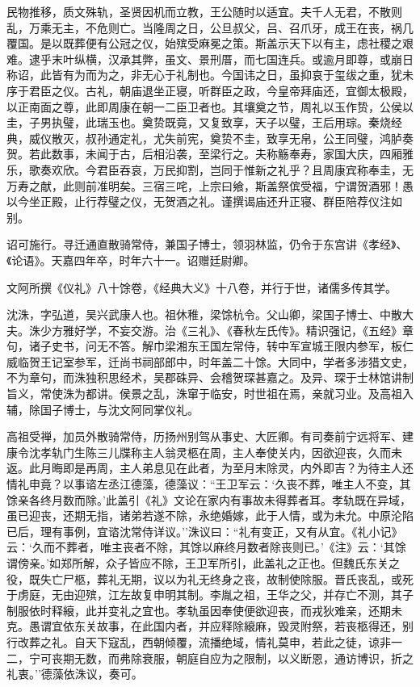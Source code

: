 \documentclass[]{article}
\begin{document}
民物推移，质文殊轨，圣贤因机而立教，王公随时以适宜。夫千人无君，不散则乱，万乘无主，不危则亡。当隆周之日，公旦叔父，吕、召爪牙，成王在丧，祸几覆国。是以既葬便有公冠之仪，始殡受麻冕之策。斯盖示天下以有主，虑社稷之艰难。逮乎末叶纵横，汉承其弊，虽文、景刑厝，而七国连兵。或逾月即尊，或崩日称诏，此皆有为而为之，非无心于礼制也。今国讳之日，虽抑哀于玺绂之重，犹未序于君臣之仪。古礼，朝庙退坐正寝，听群臣之政，今皇帝拜庙还，宜御太极殿，以正南面之尊，此即周康在朝一二臣卫者也。其壤奠之节，周礼以玉作贽，公侯以圭，子男执璧，此瑞玉也。奠贽既竟，又复致享，天子以璧，王后用琮。秦烧经典，威仪散灭，叔孙通定礼，尤失前宪，奠贽不圭，致享无帛，公王同璧，鸿胪奏贺。若此数事，未闻于古，后相沿袭，至梁行之。夫称觞奉寿，家国大庆，四厢雅乐，歌奏欢欣。今君臣吞哀，万民抑割，岂同于惟新之礼乎？且周康宾称奉圭，无万寿之献，此则前准明矣。三宿三咤，上宗曰飨，斯盖祭傧受福，宁谓贺酒邪！愚以今坐正殿，止行荐璧之仪，无贺酒之礼。谨撰谒庙还升正寝、群臣陪荐仪注如别。

诏可施行。寻迁通直散骑常侍，兼国子博士，领羽林监，仍令于东宫讲《孝经》、《论语》。天嘉四年卒，时年六十一。诏赠廷尉卿。

文阿所撰《仪礼》八十馀卷，《经典大义》十八卷，并行于世，诸儒多传其学。

沈洙，字弘道，吴兴武康人也。祖休稚，梁馀杭令。父山卿，梁国子博士、中散大夫。洙少方雅好学，不妄交游。治《三礼》、《春秋左氏传》。精识强记，《五经》章句，诸子史书，问无不答。解巾梁湘东王国左常侍，转中军宣城王限内参军，板仁威临贺王记室参军，迁尚书祠部郎中，时年盖二十馀。大同中，学者多涉猎文史，不为章句，而洙独积思经术，吴郡硃异、会稽贺琛甚嘉之。及异、琛于士林馆讲制旨义，常使洙为都讲。侯景之乱，洙窜于临安，时世祖在焉，亲就习业。及高祖入辅，除国子博士，与沈文阿同掌仪礼。

高祖受禅，加员外散骑常侍，历扬州别驾从事史、大匠卿。有司奏前宁远将军、建康令沈孝轨门生陈三儿牒称主人翁灵柩在周，主人奉使关内，因欲迎丧，久而未返。此月晦即是再周，主人弟息见在此者，为至月末除灵，内外即吉？为待主人还情礼申竟？以事谘左丞江德藻，德藻议：``王卫军云：`久丧不葬，唯主人不变，其馀亲各终月数而除。'此盖引《礼》文论在家内有事故未得葬者耳。孝轨既在异域，虽已迎丧，还期无指，诸弟若遂不除，永绝婚嫁，此于人情，或为未允。中原沦陷已后，理有事例，宜谘沈常侍详议。''洙议曰：``礼有变正，又有从宜。《礼小记》云：`久而不葬者，唯主丧者不除，其馀以麻终月数者除丧则已。'《注》云：`其馀谓傍亲。'如郑所解，众子皆应不除，王卫军所引，此盖礼之正也。但魏氏东关之役，既失亡尸柩，葬礼无期，议以为礼无终身之丧，故制使除服。晋氏丧乱，或死于虏庭，无由迎殡，江左故复申明其制。李胤之祖，王华之父，并存亡不测，其子制服依时释縗，此并变礼之宜也。孝轨虽因奉使便欲迎丧，而戎狄难亲，还期未克。愚谓宜依东关故事，在此国内者，并应释除縗麻，毁灵附祭，若丧柩得还，别行改葬之礼。自天下寇乱，西朝倾覆，流播绝域，情礼莫申，若此之徒，谅非一二，宁可丧期无数，而弗除衰服，朝庭自应为之限制，以义断恩，通访博识，折之礼衷。''德藻依洙议，奏可。
\end{document}
